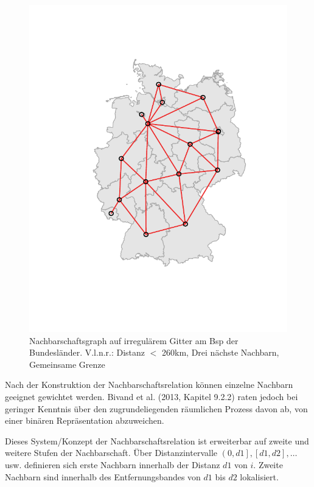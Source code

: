 \begin{figure}
\begin{minipage}[b]{.3\linewidth}
       \includegraphics[width=\linewidth,trim={2cm 3cm 1.7cm 2cm},clip]{body/figures/53-BL_nb_qc.pdf}
    \end{minipage}
    \caption[Nachbarschaftsgraph]{Nachbarschaftsgraph auf irregulärem Gitter am Bsp der Bundesländer. 
    V.l.n.r.: Distanz $<$ 260km, Drei nächste Nachbarn, Gemeinsame Grenze}
    \label{fig_neighbourgraphs}
 \end{figure}

Nach der Konstruktion der Nachbarschaftsrelation können einzelne Nachbarn geeignet gewichtet werden. 
Bivand et al. (2013, Kapitel 9.2.2) raten jedoch bei geringer Kenntnis über den zugrundeliegenden 
räumlichen Prozess davon ab, von einer binären Repräsentation abzuweichen.


Dieses System/Konzept der Nachbarschaftsrelation ist erweiterbar auf zweite und weitere Stufen der Nachbarschaft. 
Über Distanzintervalle $\left(0,d1\right],\left[d1,d2\right],\ldots$ usw. definieren sich erste Nachbarn innerhalb 
der Distanz $d1$ von $i$. Zweite Nachbarn sind innerhalb des Entfernungsbandes von $d1$ bis $d2$ lokalisiert.


